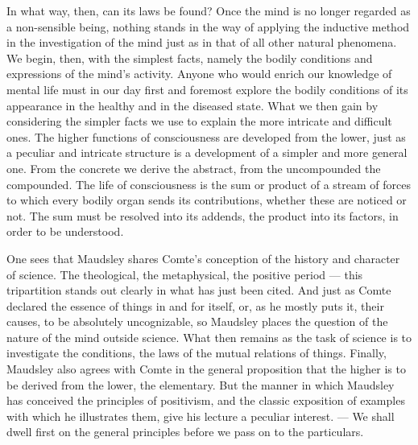 \documentclass[12pt,a4paper,openany]{book}
\newcommand{\opage}[1]{\marginnote{\footnotesize\textit{[#1]}}}
\begin{document}
In what way, then, can its laws be found? Once
the mind is no longer regarded as a non-sensible being,
nothing stands in the way of applying the inductive method
in the investigation of the mind just as in that of
all other natural phenomena. We begin, then, with the simplest
facts, namely the bodily conditions and expressions
of the mind's activity. Anyone who would enrich our knowledge
of mental life must in our day first and foremost explore
the bodily conditions of its appearance in the healthy
and in the diseased state. What we then gain by considering
the simpler facts we use to explain the
more intricate and difficult ones. The higher functions of consciousness
\opage{311}are developed from the lower, just as a peculiar and intricate
structure is a development of a simpler and more general one.
From the concrete we derive the abstract, from the uncompounded
the compounded. The life of consciousness is the sum or product of
a stream of forces to which every bodily organ
sends its contributions, whether these are noticed or not.
The sum must be resolved into its addends, the product into its factors,
in order to be understood.

One sees that Maudsley shares Comte's conception of
the history and character of science. The theological, the
metaphysical, the positive period --- this tripartition stands out
clearly in what has just been cited. And just as Comte declared
the essence of things in and for itself, or, as he mostly
puts it, their causes, to be absolutely uncognizable, so
Maudsley places the question of the nature of the mind
outside science. What then remains as
the task of science is to investigate the conditions, the laws
of the mutual relations of things. Finally, Maudsley also
agrees with Comte in the general proposition that the higher
is to be derived from the lower, the elementary. But the manner
in which Maudsley has conceived the principles of positivism, and
the classic exposition of examples with which he illustrates
them, give his lecture a peculiar interest. --- We shall dwell
first on the general principles before we pass on to
the particulars.
\end{document}
